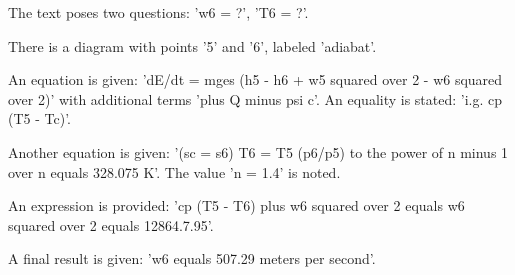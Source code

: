 The text poses two questions: 'w6 = ?', 'T6 = ?'. 

There is a diagram with points '5' and '6', labeled 'adiabat'. 

An equation is given: 
'dE/dt = mges (h5 - h6 + w5 squared over 2 - w6 squared over 2)' with additional terms 'plus Q minus psi c'. 
An equality is stated: 'i.g. cp (T5 - Tc)'.

Another equation is given: 
'(sc = s6) T6 = T5 (p6/p5) to the power of n minus 1 over n equals 328.075 K'. 
The value 'n = 1.4' is noted.

An expression is provided: 
'cp (T5 - T6) plus w6 squared over 2 equals w6 squared over 2 equals 12864.7.95'. 

A final result is given: 
'w6 equals 507.29 meters per second'.
